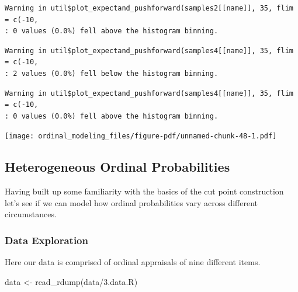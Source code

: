\documentclass[
  letterpaper,
  DIV=11,
  numbers=noendperiod]{scrartcl}
\newenvironment{Shaded}{\begin{snugshade}}{\end{snugshade}}
\newcommand{\FunctionTok}[1]{\textcolor[rgb]{0.28,0.35,0.67}{#1}}
\newcommand{\NormalTok}[1]{\textcolor[rgb]{0.00,0.23,0.31}{#1}}
\newcommand{\OtherTok}[1]{\textcolor[rgb]{0.00,0.23,0.31}{#1}}
\newcommand{\SpecialCharTok}[1]{\textcolor[rgb]{0.37,0.37,0.37}{#1}}
\newcommand{\StringTok}[1]{\textcolor[rgb]{0.13,0.47,0.30}{#1}}
\begin{document}
\begin{verbatim}
Warning in util$plot_expectand_pushforward(samples2[[name]], 35, flim = c(-10,
: 0 values (0.0%) fell above the histogram binning.
\end{verbatim}

\begin{verbatim}
Warning in util$plot_expectand_pushforward(samples4[[name]], 35, flim = c(-10,
: 2 values (0.0%) fell below the histogram binning.
\end{verbatim}

\begin{verbatim}
Warning in util$plot_expectand_pushforward(samples4[[name]], 35, flim = c(-10,
: 0 values (0.0%) fell above the histogram binning.
\end{verbatim}

\texttt{[image: ordinal\_modeling\_files/figure-pdf/unnamed-chunk-48-1.pdf]}

\subsection{Heterogeneous Ordinal
Probabilities}\label{heterogeneous-ordinal-probabilities}

Having built up some familiarity with the basics of the cut point
construction let's see if we can model how ordinal probabilities vary
across different circumstances.

\subsubsection{Data Exploration}\label{data-exploration-2}

Here our data is comprised of ordinal appraisals of nine different
items.

\begin{Shaded}
\begin{Highlighting}[]
\NormalTok{data }\OtherTok{\textless{}{-}} \FunctionTok{read\_rdump}\NormalTok{(}\StringTok{\textquotesingle{}data/3.data.R\textquotesingle{}}\NormalTok{)}
\end{Highlighting}
\end{Shaded}

\begin{Shaded}
\end{Shaded}
\end{document}
